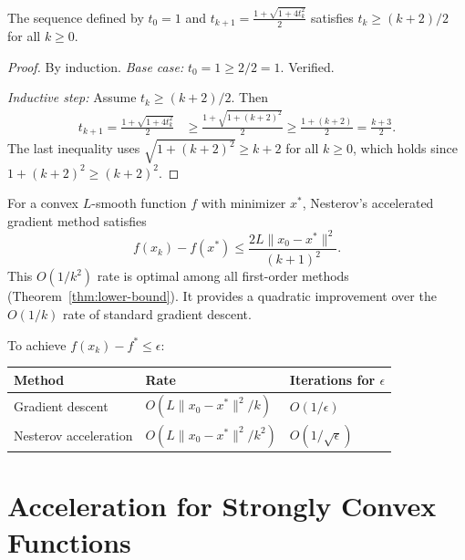 \documentclass[11pt,a4paper]{article}
\begin{document}
\begin{lemma}[Growth of $t_k$]\label{lem:tk-bound}
The sequence defined by $t_0 = 1$ and
$t_{k+1} = \frac{1 + \sqrt{1 + 4t_k^2}}{2}$ satisfies
$t_k \ge (k+2)/2$ for all $k \ge 0$.
\end{lemma}

\begin{proof}
By induction. \emph{Base case:} $t_0 = 1 \ge 2/2 = 1$. Verified.

\emph{Inductive step:} Assume $t_k \ge (k+2)/2$. Then
\begin{align*}
  t_{k+1} = \frac{1 + \sqrt{1 + 4t_k^2}}{2}
  &\ge \frac{1 + \sqrt{1 + (k+2)^2}}{2}
  \ge \frac{1 + (k+2)}{2}
  = \frac{k+3}{2}.
\end{align*}
The last inequality uses $\sqrt{1 + (k+2)^2} \ge k+2$ for all
$k \ge 0$, which holds since $1 + (k+2)^2 \ge (k+2)^2$.
\end{proof}

\begin{keyresult}[title={Nesterov's Accelerated Convergence Rate}]
For a convex $L$-smooth function $f$ with minimizer $x^*$, Nesterov's
accelerated gradient method satisfies
\[
  f(x_k) - f(x^*) \le \frac{2L\|x_0 - x^*\|^2}{(k+1)^2}.
\]
This $O(1/k^2)$ rate is optimal among all first-order methods
(Theorem~\ref{thm:lower-bound}). It provides a quadratic improvement
over the $O(1/k)$ rate of standard gradient descent.
\end{keyresult}

\begin{remark}\label{rem:complexity}
To achieve $f(x_k) - f^* \le \epsilon$:
\begin{center}
\begin{tabular}{lll}
\toprule
\textbf{Method} & \textbf{Rate} & \textbf{Iterations for $\epsilon$} \\
\midrule
Gradient descent & $O(L\|x_0-x^*\|^2/k)$ & $O(1/\epsilon)$ \\
Nesterov acceleration & $O(L\|x_0-x^*\|^2/k^2)$ & $O(1/\sqrt\epsilon)$ \\
\bottomrule
\end{tabular}
\end{center}
\end{remark}


\section{Acceleration for Strongly Convex Functions}%
\label{sec:strong-convexity}
\end{document}
